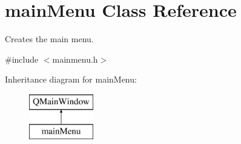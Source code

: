 \hypertarget{classmain_menu}{}\section{main\+Menu Class Reference}
\label{classmain_menu}


Creates the main menu.  




{\ttfamily \#include $<$mainmenu.\+h$>$}

Inheritance diagram for main\+Menu\+:\begin{figure}[H]
\begin{center}
\leavevmode
\includegraphics[height=2.000000cm]{classmain_menu}
\end{center}
\end{figure}

